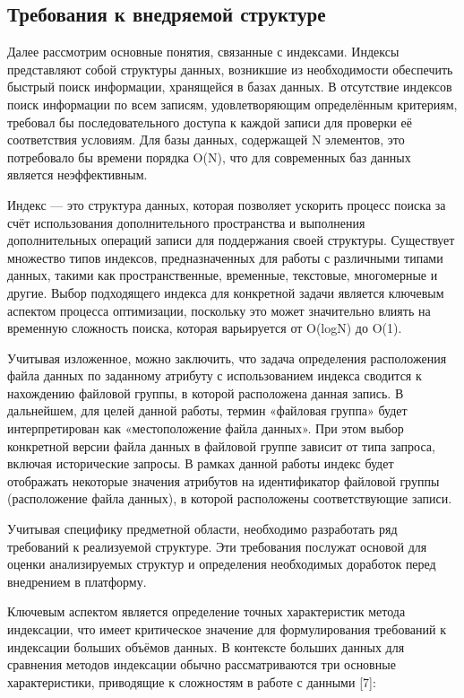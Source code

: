 \subsection{Требования к внедряемой структуре}

Далее рассмотрим основные понятия, связанные с индексами. Индексы представляют собой структуры данных, возникшие из необходимости обеспечить быстрый поиск информации, хранящейся в базах данных. В отсутствие индексов поиск информации по всем записям, удовлетворяющим определённым критериям, требовал бы последовательного доступа к каждой записи для проверки её соответствия условиям. Для базы данных, содержащей N элементов, это потребовало бы времени порядка O(N), что для современных баз данных является неэффективным.

Индекс — это структура данных, которая позволяет ускорить процесс поиска за счёт использования дополнительного пространства и выполнения дополнительных операций записи для поддержания своей структуры. Существует множество типов индексов, предназначенных для работы с различными типами данных, такими как пространственные, временные, текстовые, многомерные и другие. Выбор подходящего индекса для конкретной задачи является ключевым аспектом процесса оптимизации, поскольку это может значительно влиять на временную сложность поиска, которая варьируется от O(logN) до O(1).

Учитывая изложенное, можно заключить, что задача определения расположения файла данных по заданному атрибуту с использованием индекса сводится к нахождению файловой группы, в которой расположена данная запись. В дальнейшем, для целей данной работы, термин «файловая группа» будет интерпретирован как «местоположение файла данных». При этом выбор конкретной версии файла данных в файловой группе зависит от типа запроса, включая исторические запросы. В рамках данной работы индекс будет отображать некоторые значения атрибутов на идентификатор файловой группы (расположение файла данных), в которой расположены соответствующие записи.


Учитывая специфику предметной области, необходимо разработать ряд требований к реализуемой структуре. Эти требования послужат основой для оценки анализируемых структур и определения необходимых доработок перед внедрением в платформу.

Ключевым аспектом является определение точных характеристик метода индексации, что имеет критическое значение для формулирования требований к индексации больших объёмов данных. В контексте больших данных для сравнения методов индексации обычно рассматриваются три основные характеристики, приводящие к сложностям в работе с данными [7]:

